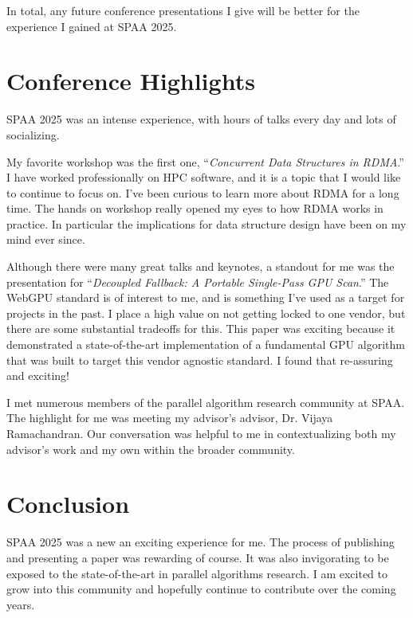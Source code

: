 \documentclass{article}
\begin{document}
In total, any future conference presentations I give
will be better for the experience I gained at SPAA 2025.

\section{Conference Highlights}

SPAA 2025 was an intense experience, with hours of talks every day and lots of socializing.

My favorite workshop was the first one, ``\textit{Concurrent Data Structures in RDMA}.''
I have worked professionally on HPC software, and it is a topic that I would like to continue to focus on.
I've been curious to learn more about RDMA for a long time.
The hands on workshop really opened my eyes to how RDMA works in practice.
In particular the implications for data structure design have been on my mind ever since.

Although there were many great talks and keynotes, a standout for me was the presentation for 
``\textit{Decoupled Fallback: A Portable Single-Pass GPU Scan}.'' 
The WebGPU standard is of interest to me, and is something I've used as a target for projects in the past.
I place a high value on not getting locked to one vendor, but there are some substantial tradeoffs for this.
This paper was exciting because it demonstrated a state-of-the-art implementation of a fundamental GPU algorithm 
that was built to target this vendor agnostic standard. 
I found that re-assuring and exciting!

I met numerous members of the parallel algorithm research community at SPAA.
The highlight for me was meeting my advisor's advisor, Dr. Vijaya Ramachandran.
Our conversation was helpful to me in contextualizing both my advisor's work and my own within the broader community.

\section{Conclusion}

SPAA 2025 was a new an exciting experience for me.
The process of publishing and presenting a paper was rewarding of course.
It was also invigorating to be exposed to the state-of-the-art 
in parallel algorithms research.
I am excited to grow into this community and hopefully continue to contribute over the coming years.
\end{document}
